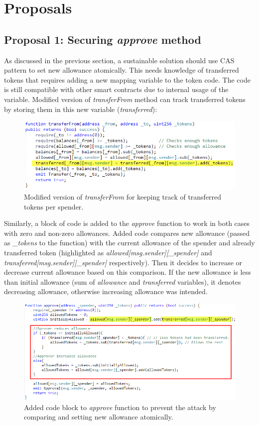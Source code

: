 
\section{Proposals}
\subsection{Proposal 1: Securing \textit{approve} method}
As discussed in the previous section, a sustainable solution should use CAS pattern\cite{Ref06} to set new allowance atomically. This needs knowledge of transferred tokens that requires adding a new mapping variable to the token code. The code is still compatible with other smart contracts due to internal usage of the variable. Modified version of \textit{transferFrom} method can track transferred tokens by storing them in this new variable (\textit{transferred}):
\begin{figure}[t]
	\centering
	\includegraphics[width=1.0\linewidth]{figures/multiple_withdrawal_14.png}
	\caption{Modified version of \textit{transferFrom} for keeping track of transferred tokens per spender.}
\end{figure}
\noindent Similarly, a block of code is added to the \textit{approve} function to work in both cases with zero and non-zero allowances. Added code compares new allowance (passed as \textit{\_tokens} to the function) with the current allowance of the spender and already transferred token (highlighted as \textit{allowed[msg.sender][\_spender]} and \textit{transferred[msg.sender][\_spender]} respectively). Then it decides to increase or decrease current allowance based on this comparison. If the new allowance is less than initial allowance (sum of \textit{allowance} and \textit{transferred} variables), it denotes decreasing allowance, otherwise increasing allowance was intended.
\begin{figure}[t]
	\centering
	\includegraphics[width=1.0\linewidth]{figures/multiple_withdrawal_15.png}
	\caption{Added code block to \textit{approve} function to prevent the attack by comparing and setting new allowance atomically.}
\end{figure}
